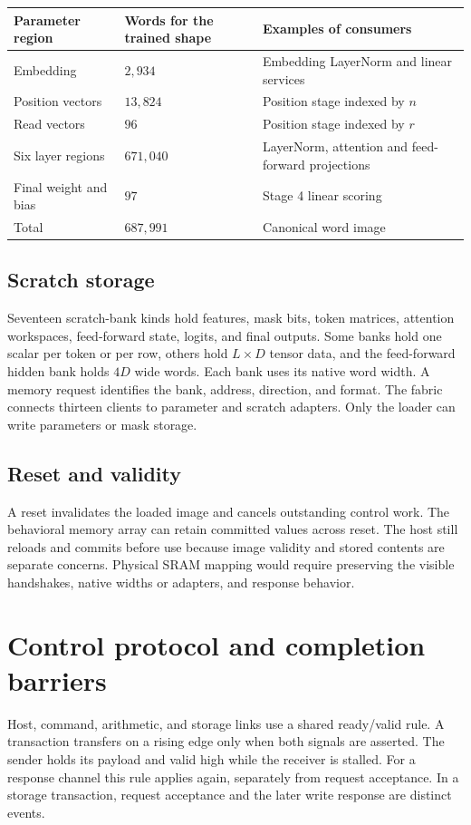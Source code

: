 {\smalltbl
\begin{tabularx}{\linewidth}{@{}P{38mm}P{36mm}Y@{}}
\toprule
Parameter region & Words for the trained shape & Examples of consumers\\ \midrule
Embedding & \(2{,}934\) & Embedding LayerNorm and linear services\\
Position vectors & \(13{,}824\) & Position stage indexed by \(n\)\\
Read vectors & \(96\) & Position stage indexed by \(r\)\\
Six layer regions & \(671{,}040\) & LayerNorm, attention and feed-forward projections\\
Final weight and bias & \(97\) & Stage 4 linear scoring\\ \midrule
Total & \(687{,}991\) & Canonical word image\\
\bottomrule
\end{tabularx}}

\subsection{Scratch storage}
Seventeen scratch-bank kinds hold features, mask bits, token matrices, attention workspaces, feed-forward state, logits, and final outputs. Some banks hold one scalar per token or per row, others hold \(L\times D\) tensor data, and the feed-forward hidden bank holds \(4D\) wide words. Each bank uses its native word width. A memory request identifies the bank, address, direction, and format. The fabric connects thirteen clients to parameter and scratch adapters. Only the loader can write parameters or mask storage.

\subsection{Reset and validity}
A reset invalidates the loaded image and cancels outstanding control work. The behavioral memory array can retain committed values across reset. The host still reloads and commits before use because image validity and stored contents are separate concerns. Physical SRAM mapping would require preserving the visible handshakes, native widths or adapters, and response behavior.
\clearpage

\section{Control protocol and completion barriers}
Host, command, arithmetic, and storage links use a shared ready/valid rule. A transaction transfers on a rising edge only when both signals are asserted. The sender holds its payload and valid high while the receiver is stalled. For a response channel this rule applies again, separately from request acceptance. In a storage transaction, request acceptance and the later write response are distinct events.


